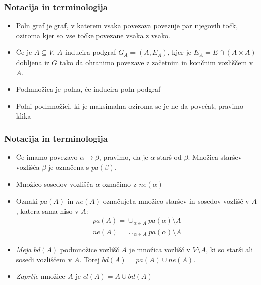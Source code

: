 \documentclass{beamer}
\begin{document}
\begin{frame}
    \frametitle{Notacija in terminologija}
    \begin{itemize}
        \item Poln graf je graf, v katerem vsaka povezava povezuje par njegovih točk,
        oziroma kjer so vse točke povezane vsaka z vsako.
        \item  Če je $A \subseteq V$, $A$ inducira podgraf $G_A = (A, E_A)$,
        kjer je $E_A = E \cap (A \times A)$ dobljena iz $G$ tako da ohranimo povezave z 
        začetnim in končnim vozliščem v $A$.
        \item Podmnožica je polna, če inducira poln podgraf
        \item Polni podmnožici, ki je maksimalna oziroma se je ne da povečat, pravimo klika
   
    \end{itemize}

\end{frame}
\begin{frame}
    \frametitle{Notacija in terminologija}
    \begin{itemize}
        \item Če imamo povezavo $ \alpha \longrightarrow \beta $, pravimo, da je $\alpha$ starš od $\beta$.
        Množica staršev vozlišča $\beta$ je označena s $pa(\beta)$.  
        \item Množico sosedov vozlišča $\alpha$ označimo z $ne(\alpha)$
        \item Oznaki $pa(A)$ in $ne(A)$ označujeta množico staršev in sosedov vozlišč v $A$,
        katera sama niso v $A$:
        \begin{align*}
              pa(A) = \cup_{\alpha \in A} pa(\alpha) \setminus A \\
              ne(A) = \cup_{\alpha \in A} pa(\alpha) \setminus A
        \end{align*}
        \item \emph{Meja} $bd(A)$ podmnožice vozlišč $A$ je množica vozlišč v $ V \setminus A $,
        ki so starši ali sosedi vozliščem v $A$. Torej $ bd(A) = pa(A) \cup ne(A)$. 
        \item \emph{Zaprtje} množice $A$ je $cl(A) = A \cup bd(A) $
    \end{itemize}

\end{frame}
\end{document}
